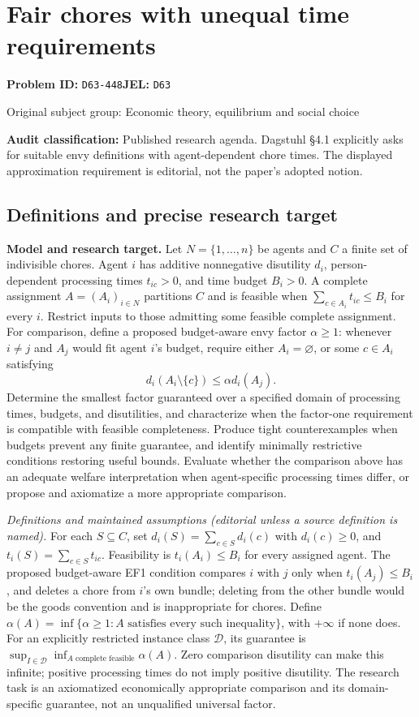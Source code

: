\documentclass[11pt,a4paper]{article}
\begin{document}
\section*{Fair chores with unequal time requirements}
\textbf{Problem ID:} \texttt{D63-448}\quad \textbf{JEL:} \texttt{D63}\par
\label{problem:OP-0277}
{\sffamily\small\color{muted}Original subject group: Economic theory, equilibrium and social choice\par}
\label{definitions:problem:30007559}
\textbf{Audit classification:} Published research agenda. Dagstuhl §4.1 explicitly asks for suitable envy definitions with agent-dependent chore times. The displayed approximation requirement is editorial, not the paper’s adopted notion.
\subsection*{Definitions and precise research target}
\textbf{Model and research target.} Let \(N=\{1,\ldots,n\}\) be agents and \(C\) a finite set of indivisible chores. Agent \(i\) has additive nonnegative disutility \(d_i\), person-dependent processing times \(t_{ic}>0\), and time budget \(B_i>0\). A complete assignment \(A=(A_i)_{i\in N}\) partitions \(C\) and is feasible when \(\sum_{c\in A_i}t_{ic}\leq B_i\) for every \(i\). Restrict inputs to those admitting some feasible complete assignment. For comparison, define a proposed budget-aware envy factor \(\alpha\geq1\): whenever \(i\ne j\) and \(A_j\) would fit agent \(i\)'s budget, require either \(A_i=\varnothing\), or some \(c\in A_i\) satisfying
\[
 d_i(A_i\setminus\{c\})\leq\alpha d_i(A_j).
\]
Determine the smallest factor guaranteed over a specified domain of processing times, budgets, and disutilities, and characterize when the factor-one requirement is compatible with feasible completeness. Produce tight counterexamples when budgets prevent any finite guarantee, and identify minimally restrictive conditions restoring useful bounds. Evaluate whether the comparison above has an adequate welfare interpretation when agent-specific processing times differ, or propose and axiomatize a more appropriate comparison.

\emph{Definitions and maintained assumptions (editorial unless a source definition is named).} For each \(S\subseteq C\), set \(d_i(S)=\sum_{c\in S}d_i(c)\) with \(d_i(c)\ge0\), and \(t_i(S)=\sum_{c\in S}t_{ic}\). Feasibility is \(t_i(A_i)\le B_i\) for every assigned agent. The proposed budget-aware EF1 condition compares \(i\) with \(j\) only when \(t_i(A_j)\le B_i\), and deletes a chore from \(i\)'s own bundle; deleting from the other bundle would be the goods convention and is inappropriate for chores. Define \(\alpha(A)=\inf\{\alpha\ge1:A\text{ satisfies every such inequality}\}\), with \(+\infty\) if none does. For an explicitly restricted instance class \(\mathcal D\), its guarantee is \(\sup_{I\in\mathcal D}\inf_{A\text{ complete feasible}}\alpha(A)\). Zero comparison disutility can make this infinite; positive processing times do not imply positive disutility. The research task is an axiomatized economically appropriate comparison and its domain-specific guarantee, not an unqualified universal factor.
\end{document}
